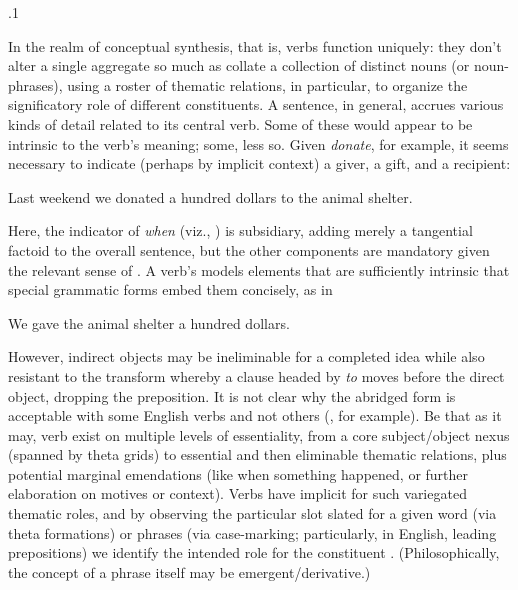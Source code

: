 \documentclass[11pt, twocolumn]{article}
\begin{document}
\p.1{%
\:\+In the realm of conceptual synthesis, that is, verbs
function uniquely: they don't alter a single aggregate so
much as collate a collection of distinct nouns
(or noun-phrases), using a roster of thematic relations,
in particular, to organize
the significatory role of different constituents. \> 
A sentence, in general, accrues various kinds of detail
related to its central verb. \>  Some of these
would appear to be intrinsic to the verb's meaning; some, less
so. \>  Given \textit{donate}, for example, it seems necessary
to indicate (perhaps by implicit context) a giver, a gift,
and a recipient:

\begin{exsGroup}

\exsItem{}  \>  Last weekend we donated a hundred dollars to the animal shelter. \> 

\end{exsGroup}

\nip{}%
Here, the indicator of \textit{when} (viz., ) is subsidiary, adding merely a tangential
factoid to the overall sentence, but the other components are
mandatory given the relevant sense of . \>  A verb's
 models elements that are sufficiently
intrinsic that special grammatic forms embed them concisely,
as in

\begin{exsGroup}

\exsItem{}  \>  We gave the animal shelter a hundred dollars. \> 

\end{exsGroup}

\nip{}%
However, indirect objects may be ineliminable for a completed idea while
also resistant to the transform whereby a clause headed
by \textit{to} moves before the direct object, dropping the preposition. \> 
It is not clear why the abridged  form is acceptable
with some English verbs and not others (, for example). \>  Be that as it may,
verb  exist on multiple levels of essentiality,
from a core subject/object nexus (spanned by theta grids) to
essential and then eliminable thematic relations, plus potential marginal
emendations (like when something happened, or further elaboration
on motives or context). \>  Verbs have implicit
 for such variegated thematic roles, and by observing
the particular slot slated for a given word (via theta formations)
or phrases (via case-marking; particularly, in English, leading
prepositions) \pgl{}we identify
the intended role for the constituent . \>  (Philosophically,
the concept of a phrase itself may be emergent/derivative.)\;
}%
\end{document}
